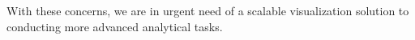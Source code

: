 \documentclass[format=acmsmall, review=false, screen=true]{acmart}
\newcommand{\ti}{\textcolor[rgb]{0,0,0}}
\begin{document}
{}\ti{With these concerns, we are in urgent need of a scalable visualization solution to conducting more advanced analytical tasks.}%
\end{document}
